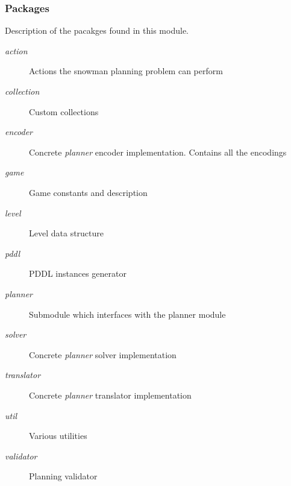 \documentclass{report}
\theoremstyle{plain}
\begin{document}
\newpage

\subsubsection{Packages}
Description of the pacakges found in this module.
\begin{description}
    \item[\emph{action}] Actions the snowman planning problem can perform
    \item[\emph{collection}] Custom collections
    \item[\emph{encoder}] Concrete \emph{planner} encoder implementation. Contains all the encodings
    \item[\emph{game}] Game constants and description
    \item[\emph{level}] Level data structure
    \item[\emph{pddl}] PDDL instances generator
    \item[\emph{planner}] Submodule which interfaces with the planner module
    \item[\emph{solver}] Concrete \emph{planner} solver implementation
    \item[\emph{translator}] Concrete \emph{planner} translator implementation
    \item[\emph{util}] Various utilities
    \item[\emph{validator}] Planning validator
\end{description}
\end{document}
